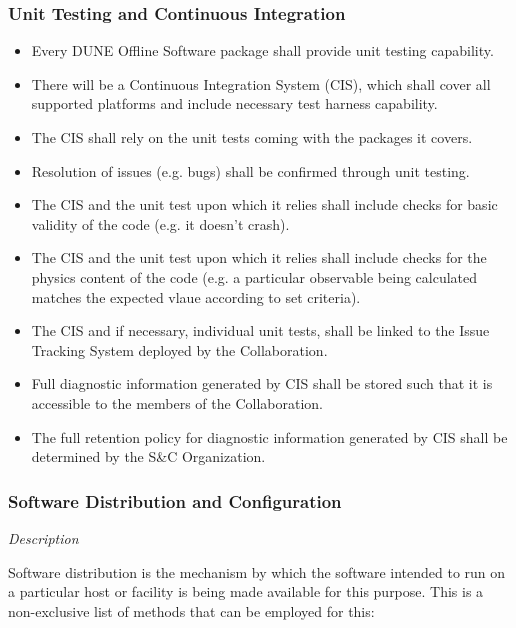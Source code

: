 \subsubsection{Unit Testing and Continuous Integration}
\begin{itemize}
\item Every DUNE Offline Software package shall provide unit testing capability.

\item There will be a Continuous Integration System (CIS), which shall cover all supported platforms and include necessary test harness capability.

\item The CIS shall rely on the unit tests coming with the packages it covers.

\item Resolution of issues (e.g. bugs) shall be confirmed through unit testing.

\item The CIS and the unit test upon which it relies shall include checks for basic validity of the code (e.g. it doesn't crash).

\item The CIS and the unit test upon which it relies shall include checks for the physics content of the code (e.g. a particular observable being calculated matches the expected vlaue according to set criteria).

\item The CIS and if necessary, individual unit tests, shall be linked to the Issue Tracking System deployed by the Collaboration.

\item Full diagnostic information generated by CIS shall be stored such that it is accessible to the members of the Collaboration.

\item The full retention policy for diagnostic information generated by CIS shall be determined by the S\&C Organization.
\end{itemize}


\subsubsection{Software Distribution and Configuration}
\textit{Description}

\noindent
Software distribution is the mechanism by which the software intended to run on a particular host or facility is being made available for this purpose. This is a non-exclusive list of methods that can be employed for this:


